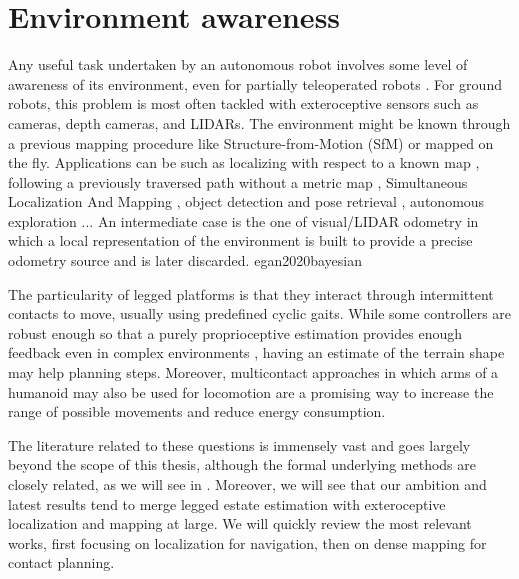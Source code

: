 \section{Environment awareness}
Any useful task undertaken by an autonomous robot involves some level of awareness of its environment, even for partially teleoperated robots \cite{koolen2016design}. 
For ground robots, this problem is most often tackled with exteroceptive sensors such as cameras, depth cameras, and LIDARs.
The environment might be known through a previous mapping procedure like Structure-from-Motion (SfM) \cite{triggs1999bundle} or mapped on the fly. 
Applications can be such as localizing with respect to a known map \cite{dellaert1999monte},
following a previously traversed path without a metric map \cite{furgale2010visual}, Simultaneous Localization And Mapping 
\cite{aulinas2008slam, cadena2016past}, object detection and pose retrieval \cite{du2021vision}, autonomous exploration \cite{rouvcek2019darpa, kulkarni2021autonomous}... 
An intermediate case is the one of visual/LIDAR odometry in which a local representation of the environment is built to provide a 
precise odometry source \cite{scaramuzza2011visual} and is later discarded. 
e{gan2020bayesian}


The particularity of legged platforms is that they interact through intermittent contacts to move, usually using predefined cyclic gaits. While some controllers are 
robust enough so that a purely proprioceptive estimation provides enough feedback even in complex environments \cite{tan2018sim, lee2020learning}, having an estimate of 
the terrain shape may help planning steps. Moreover, multicontact approaches \cite{carpentier2017multi, henze2017multi} in which arms of a humanoid may also be used 
for locomotion are a promising way to increase the range of possible movements and reduce energy consumption. 

The literature related to these questions is immensely vast and goes largely beyond the scope of this thesis, although the formal underlying methods are closely related,
as we will see in . Moreover, we will see that our ambition and latest results tend to merge legged estate estimation with
exteroceptive localization and mapping at large. We will quickly review the most relevant works, first focusing on localization \eg for navigation, then 
on dense mapping for contact planning. 

